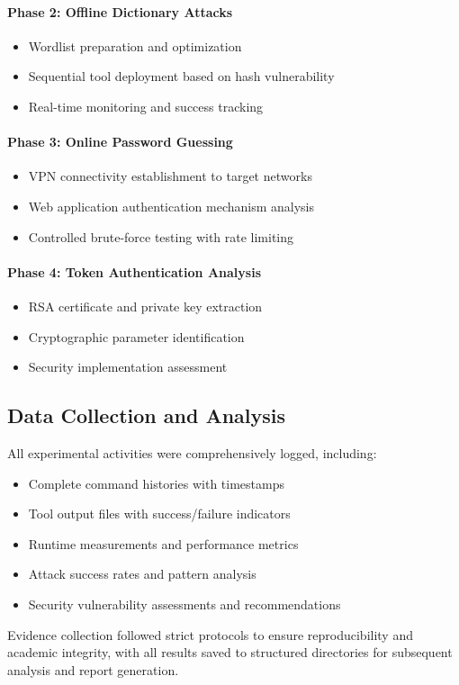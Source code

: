 \paragraph{Phase 2: Offline Dictionary Attacks}
\begin{itemize}
    \item Wordlist preparation and optimization
    \item Sequential tool deployment based on hash vulnerability
    \item Real-time monitoring and success tracking
\end{itemize}

\paragraph{Phase 3: Online Password Guessing}
\begin{itemize}
    \item VPN connectivity establishment to target networks
    \item Web application authentication mechanism analysis
    \item Controlled brute-force testing with rate limiting
\end{itemize}

\paragraph{Phase 4: Token Authentication Analysis}
\begin{itemize}
    \item RSA certificate and private key extraction
    \item Cryptographic parameter identification
    \item Security implementation assessment
\end{itemize}

\subsection{Data Collection and Analysis}

All experimental activities were comprehensively logged, including:
\begin{itemize}
    \item Complete command histories with timestamps
    \item Tool output files with success/failure indicators
    \item Runtime measurements and performance metrics
    \item Attack success rates and pattern analysis
    \item Security vulnerability assessments and recommendations
\end{itemize}

Evidence collection followed strict protocols to ensure reproducibility and academic integrity, with all results saved to structured directories for subsequent analysis and report generation.
